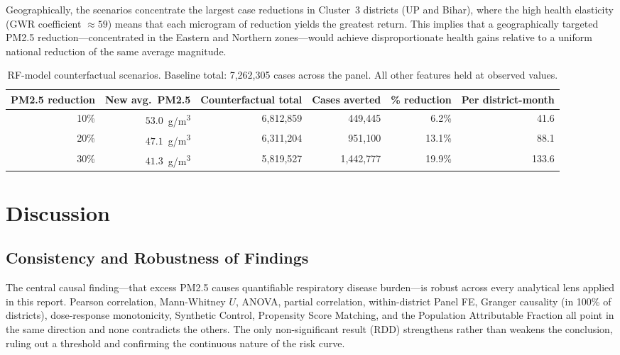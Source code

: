 \documentclass{article}
\begin{document}
Geographically, the scenarios concentrate the largest case reductions in Cluster~3
districts (UP and Bihar), where the high health elasticity (GWR coefficient $\approx 59$)
means that each microgram of reduction yields the greatest return. This implies that
a geographically targeted PM2.5 reduction---concentrated in the Eastern and Northern
zones---would achieve disproportionate health gains relative to a uniform national
reduction of the same average magnitude.

\begin{table}[ht]
  \caption{RF-model counterfactual scenarios. Baseline total: 7,262,305 cases
  across the panel. All other features held at observed values.}
  \label{tab:counterfactual}
  \centering
  \small
  \begin{tabular}{rrrrrr}
    \toprule
    PM2.5 reduction & New avg.\ PM2.5 & Counterfactual total & Cases averted & \% reduction & Per district-month \\
    \midrule
    10\% & $53.0$~\textmu{}g/m\textsuperscript{3} & 6,812,859 & \phantom{0,}449,445 & 6.2\%  & 41.6 \\
    20\% & $47.1$~\textmu{}g/m\textsuperscript{3} & 6,311,204 & \phantom{0,}951,100 & 13.1\% & 88.1 \\
    30\% & $41.3$~\textmu{}g/m\textsuperscript{3} & 5,819,527 & 1,442,777           & 19.9\% & 133.6 \\
    \bottomrule
  \end{tabular}
\end{table}

\section{Discussion}
\label{sec:discussion}

\subsection{Consistency and Robustness of Findings}

The central causal finding---that excess PM2.5 causes quantifiable respiratory disease
burden---is robust across every analytical lens applied in this report. Pearson correlation,
Mann-Whitney $U$, ANOVA, partial correlation, within-district Panel FE, Granger causality
(in 100\% of districts), dose-response monotonicity, Synthetic Control, Propensity Score
Matching, and the Population Attributable Fraction all point in the same direction and none
contradicts the others. The only non-significant result (RDD) strengthens rather than
weakens the conclusion, ruling out a threshold and confirming the continuous nature of the
risk curve.
\end{document}
